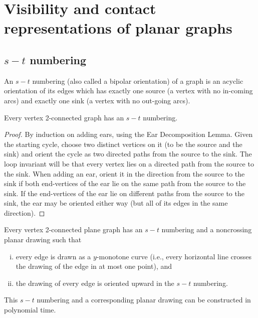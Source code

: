 \chapter{Visibility and contact representations of planar graphs}

\section{$s-t$ numbering}

\begin{defn}
	An $s - t$ numbering (also called a bipolar orientation) of a graph is an acyclic orientation of its edges which has exactly one source (a vertex with no in-coming arcs) and exactly one sink (a vertex with no out-going arcs).
\end{defn}

\begin{prop}
	Every vertex 2-connected graph has an $s - t$ numbering.
\end{prop}

\begin{proof}
	By induction on adding ears, using the Ear Decomposition Lemma. Given the starting cycle, choose two distinct vertices on it (to be the source and the sink) and orient the cycle as two directed paths from the source to the sink. The loop invariant will be that every vertex lies on a directed path from the source to the sink. When adding an ear, orient it in the direction from the source to the sink if both end-vertices of the ear lie on the same path from the source to the sink. If the end-vertices of the ear lie on different paths from the source to the sink, the ear may be oriented either way (but all of its edges in the same direction).
\end{proof}

\begin{thm}
	Every vertex 2-connected plane graph has an $s - t$ numbering and a noncrossing planar drawing such that
	
	\begin{enumerate}[i)]
		\item every edge is drawn as a $y$-monotone curve (i.e., every horizontal line crosses the drawing of the edge in at most one point), and
		\item the drawing of every edge is oriented upward in the $s - t$ numbering.
	\end{enumerate}
	\label{thm-1}
\end{thm}

This $s - t$ numbering and a corresponding planar drawing can be constructed in polynomial time.

